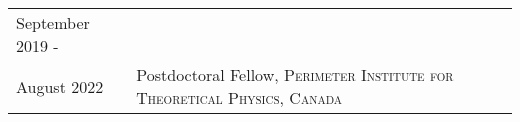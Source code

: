\vspace*{-1.6cm}
\begin{longtable}{R{3.5cm}|p{14.8cm}}
 	September 2019 - \\ August 2022 & Postdoctoral Fellow, \textsc{Perimeter Institute for Theoretical Physics, Canada} \\
\end{longtable}
